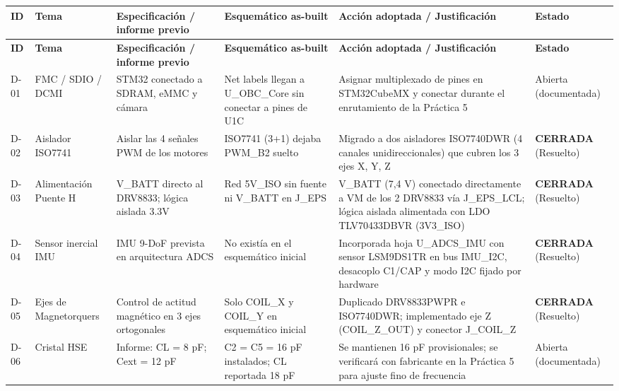 \tiny
\setlength{\tabcolsep}{2.5pt}
\renewcommand{\arraystretch}{1.15}
\begin{longtable}{|>{\raggedright\arraybackslash}p{0.8cm}|>{\raggedright\arraybackslash}p{1.8cm}|>{\raggedright\arraybackslash}p{3.2cm}|>{\raggedright\arraybackslash}p{3.8cm}|>{\raggedright\arraybackslash}p{4.0cm}|>{\raggedright\arraybackslash}p{1.6cm}|}
\hline
\textbf{ID} & \textbf{Tema} & \textbf{Especificación / informe previo} & \textbf{Esquemático as-built} & \textbf{Acción adoptada / Justificación} & \textbf{Estado} \\ \hline
\endfirsthead
\hline
\textbf{ID} & \textbf{Tema} & \textbf{Especificación / informe previo} & \textbf{Esquemático as-built} & \textbf{Acción adoptada / Justificación} & \textbf{Estado} \\ \hline
\endhead
D-01 & FMC / SDIO / DCMI & STM32 conectado a SDRAM, eMMC y cámara & Net labels llegan a U\_OBC\_Core sin conectar a pines de U1C & Asignar multiplexado de pines en STM32CubeMX y conectar durante el enrutamiento de la Práctica 5 & Abierta (documentada) \\ \hline
D-02 & Aislador ISO7741 & Aislar las 4 señales PWM de los motores & ISO7741 (3+1) dejaba PWM\_B2 suelto & Migrado a dos aisladores ISO7740DWR (4 canales unidireccionales) que cubren los 3 ejes X, Y, Z & \textbf{CERRADA} (Resuelto) \\ \hline
D-03 & Alimentación Puente H & V\_BATT directo al DRV8833; lógica aislada 3.3V & Red 5V\_ISO sin fuente ni V\_BATT en J\_EPS & V\_BATT (7,4 V) conectado directamente a VM de los 2 DRV8833 vía J\_EPS\_LCL; lógica aislada alimentada con LDO TLV70433DBVR (3V3\_ISO) & \textbf{CERRADA} (Resuelto) \\ \hline
D-04 & Sensor inercial IMU & IMU 9-DoF prevista en arquitectura ADCS & No existía en el esquemático inicial & Incorporada hoja U\_ADCS\_IMU con sensor LSM9DS1TR en bus IMU\_I2C, desacoplo C1/CAP y modo I2C fijado por hardware & \textbf{CERRADA} (Resuelto) \\ \hline
D-05 & Ejes de Magnetorquers & Control de actitud magnético en 3 ejes ortogonales & Solo COIL\_X y COIL\_Y en esquemático inicial & Duplicado DRV8833PWPR e ISO7740DWR; implementado eje Z (COIL\_Z\_OUT) y conector J\_COIL\_Z & \textbf{CERRADA} (Resuelto) \\ \hline
D-06 & Cristal HSE & Informe: CL = 8 pF; Cext = 12 pF & C2 = C5 = 16 pF instalados; CL reportada 18 pF & Se mantienen 16 pF provisionales; se verificará con fabricante en la Práctica 5 para ajuste fino de frecuencia & Abierta (documentada) \\ \hline

\end{longtable}
